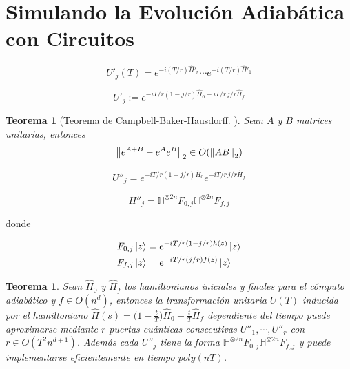 \documentclass[11pt, spanish]{report}
\numberwithin{equation}{section}
\newtheorem{teo}[defin]{Teorema}
\numberwithin{defin}{section}
\newenvironment{yellowBox}{\begin{tcolorbox}[colback=yellow!5!white,colframe=yellow!75!black]}{\end{tcolorbox}}
\begin{document}
\section{Simulando la Evolución Adiabática con Circuitos}

\begin{equation}
U'_j(T)=e^{-i(T/r)\hat{H}'_r}\cdots e^{-i(T/r)\hat{H}'_1}
\end{equation}

\begin{equation}
U'_j:=e^{-iT/r(1-j/r)\hat{H}_0-iT/r\, j/r\hat{H}_f}
\end{equation}

\begin{yellowBox}
\begin{teo} [Teorema de Campbell-Baker-Hausdorff. \cite{bhatia2013matrix}]
Sean $A$ y $B$ matrices unitarias, entonces\footnotemark{} 
\begin{equation}
\norm{e^{A+B}-e^Ae^B}_2\in O(\norm{AB}_2)
\end{equation}
\end{teo}
\end{yellowBox}


\begin{equation}
U''_j=e^{-iT/r(1-j/r)\hat{H}_0}e^{-iT/r\, j/r \hat{H}_f}
\end{equation}

\begin{equation}
H''_j=\mathbb{H}^{\otimes 2n}F_{0,j}\mathbb{H}^{\otimes 2n}F_{f,j}
\end{equation}

donde 

\begin{equation}
\begin{split}
F_{0,j}\ket{z} &= e^{-iT/r(1-j/r) h(z)}\ket{z}\\
F_{f,j}\ket{z} &= e^{-iT/r(j/r) f(z)}\ket{z}
\end{split}
\end{equation}


\begin{yellowBox}
\begin{teo} Sean $\hat{H}_0$ y $\hat{H}_f$ los hamiltonianos iniciales y finales para el cómputo adiabático y $f\in O(n^d)$, entonces la transformación unitaria $U(T)$ inducida por el hamiltoniano $\hat{H}(s)=\Big(1-\frac{t}{T}\Big)\hat{H}_0+\frac{t}{T}\hat{H}_f$ dependiente del tiempo puede aproximarse mediante $r$ puertas cuánticas consecutivas $U''_1,\cdots,U''_r$ con $r\in O(T^2n^{d+1})$. Además cada $U''_j$ tiene la forma $\mathbb{H}^{\otimes 2n}F_{0,j}\mathbb{H}^{\otimes 2n}F_{f,j}$ y puede implementarse eficientemente en tiempo $poly(nT)$.
\end{teo}
\end{yellowBox}
\end{document}
